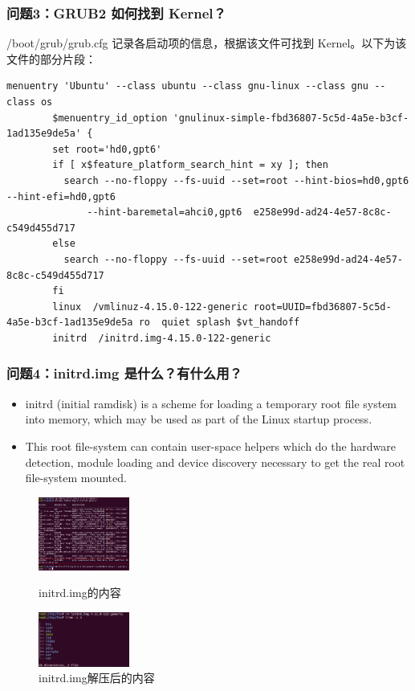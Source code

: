\documentclass{beamer}
\begin{document}
\begin{frame}[fragile]
    \frametitle{问题3：GRUB2 如何找到 Kernel？}
    /boot/grub/grub.cfg 记录各启动项的信息，根据该文件可找到 Kernel。以下为该文件的部分片段：

    \begin{lstlisting}[basicstyle=\tiny]
    menuentry 'Ubuntu' --class ubuntu --class gnu-linux --class gnu --class os
        $menuentry_id_option 'gnulinux-simple-fbd36807-5c5d-4a5e-b3cf-1ad135e9de5a' {
        set root='hd0,gpt6'
        if [ x$feature_platform_search_hint = xy ]; then
          search --no-floppy --fs-uuid --set=root --hint-bios=hd0,gpt6 --hint-efi=hd0,gpt6
              --hint-baremetal=ahci0,gpt6  e258e99d-ad24-4e57-8c8c-c549d455d717
        else
          search --no-floppy --fs-uuid --set=root e258e99d-ad24-4e57-8c8c-c549d455d717
        fi
        linux  /vmlinuz-4.15.0-122-generic root=UUID=fbd36807-5c5d-4a5e-b3cf-1ad135e9de5a ro  quiet splash $vt_handoff
        initrd  /initrd.img-4.15.0-122-generic
    \end{lstlisting}
\end{frame}

\begin{frame}
    \frametitle{问题4：initrd.img 是什么？有什么用？}

    \footnotesize
    \begin{itemize}
        \item initrd (initial ramdisk) is a scheme for loading a temporary root file system into memory, which may be used as part of the Linux startup process.
        \item This root file-system can contain user-space helpers which do the hardware detection, module loading and device discovery necessary to get the real root file-system mounted.
    \end{itemize}

    \begin{figure}[htbp]
    \centering
    \begin{minipage}[t]{0.48\textwidth}
    \centering
    \includegraphics[width=3cm]{images/initrd_binwalk.png}
    \caption{initrd.img的内容}
    \end{minipage}
    \begin{minipage}[t]{0.48\textwidth}
    \centering
    \includegraphics[width=3cm]{images/initrd_unpack.png}
    \caption{initrd.img解压后的内容}
    \end{minipage}
    \end{figure}
\end{frame}
\end{document}
